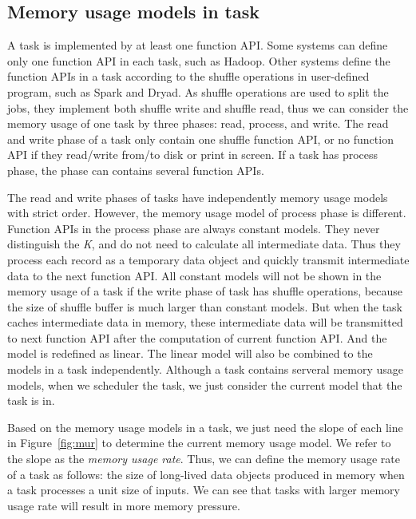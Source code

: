 \subsection{Memory usage models in task}
\label{subsec:taskmodel}

A task is implemented by at least one function API. Some systems can define only one function API in each task, such as Hadoop. Other systems define the function APIs in a task according to the shuffle operations in user-defined program, such as Spark and Dryad. As shuffle operations are used to split the jobs, they implement both shuffle write and shuffle read, thus we can consider the memory usage of one task by three phases: read, process, and write. The read and write phase of a task only contain one shuffle function API, or no function API if they read/write from/to disk or print in screen. If a task has process phase, the phase can contains several function APIs. 

The read and write phases of tasks have independently memory usage models with strict order. However, the memory usage model of process phase is different. Function APIs in the process phase are always constant models. They never distinguish the \textit{K}, and do not need to calculate all intermediate data. Thus they process each record as a temporary data object and quickly transmit intermediate data to the next function API. All constant models will not be shown in the memory usage of a task if the write phase of task has shuffle operations, because the size of shuffle buffer is much larger than constant models. But when the task caches intermediate data in memory, these intermediate data will be transmitted to next function API after the computation of current function API. And the model is redefined as linear. The linear model will also be combined to the models in a task independently. Although a task contains serveral memory usage models, when we scheduler the task, we just consider the current model that the task is in.

Based on the memory usage models in a task, we just need the slope of each line in Figure~\ref{fig:mur} to determine the current memory usage model. We refer to the slope as the \textit{memory usage rate}. Thus, we can define the memory usage rate of a task as follows: the size of long-lived data objects produced in memory when a task processes a unit size of inputs. We can see that tasks with larger memory usage rate will result in more memory pressure.


